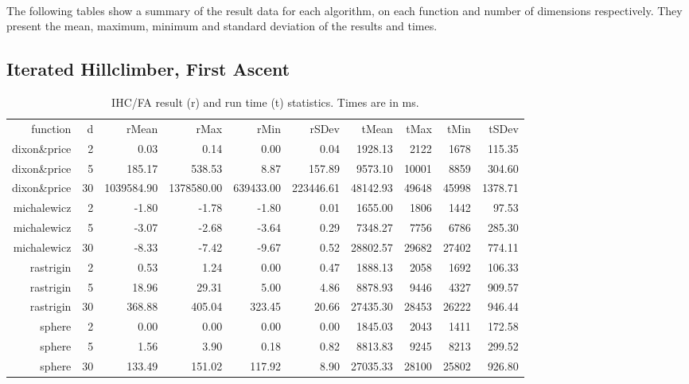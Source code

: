 \documentclass{article}
\begin{document}
    \paragraph{}
    The following tables show a summary of the result data for each algorithm, on each function and number of dimensions respectively. They present the mean, maximum, minimum and standard deviation of the results and times.
	\subsection{Iterated Hillclimber, First Ascent}
    \begin{table}[ht]
        \centering
        {\footnotesize
            \begin{tabular}{rr|rrrrrrrr}
            function & d & rMean & rMax & rMin & rSDev & tMean & tMax & tMin & tSDev \\ 
            dixon\&price & 2 & 0.03 & 0.14 & 0.00 & 0.04 & 1928.13 & 2122 & 1678 & 115.35 \\ \hline
            dixon\&price & 5 & 185.17 & 538.53 & 8.87 & 157.89 & 9573.10 & 10001 & 8859 & 304.60 \\ \hline
            dixon\&price & 30 & 1039584.90 & 1378580.00 & 639433.00 & 223446.61 & 48142.93 & 49648 & 45998 & 1378.71 \\ \hline  
            michalewicz & 2 & -1.80 & -1.78 & -1.80 & 0.01 & 1655.00 & 1806 & 1442 & 97.53 \\ \hline
            michalewicz & 5 & -3.07 & -2.68 & -3.64 & 0.29 & 7348.27 & 7756 & 6786 & 285.30 \\ \hline
            michalewicz & 30 & -8.33 & -7.42 & -9.67 & 0.52 & 28802.57 & 29682 & 27402 & 774.11 \\ \hline
            rastrigin & 2 & 0.53 & 1.24 & 0.00 & 0.47 & 1888.13 & 2058 & 1692 & 106.33 \\ \hline
            rastrigin & 5 & 18.96 & 29.31 & 5.00 & 4.86 & 8878.93 & 9446 & 4327 & 909.57 \\ \hline
            rastrigin & 30 & 368.88 & 405.04 & 323.45 & 20.66 & 27435.30 & 28453 & 26222 & 946.44 \\ \hline
            sphere & 2 & 0.00 & 0.00 & 0.00 & 0.00 & 1845.03 & 2043 & 1411 & 172.58 \\ \hline
            sphere & 5 & 1.56 & 3.90 & 0.18 & 0.82 & 8813.83 & 9245 & 8213 & 299.52 \\ \hline
            sphere & 30 & 133.49 & 151.02 & 117.92 & 8.90 & 27035.33 & 28100 & 25802 & 926.80 \\ \hline
        \end{tabular}
        }
        \caption{IHC/FA result (r) and run time (t) statistics. Times are in ms.}
    \end{table}
\end{document}
